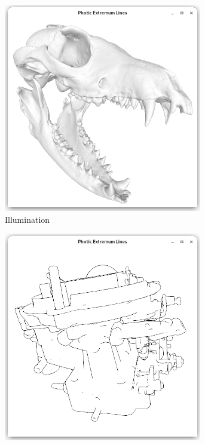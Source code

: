 \documentclass[9pt,fleqn,twoside,twocolumn]{stdglobal}
\begin{document}
\begin{figure}
\begin{subfigure}[t]{0.19\textwidth}
        \includegraphics[width=0.95\textwidth,trim={15px 15 15 50},clip]{images/results/skull.png}
        \caption{Illumination}
      \end{subfigure}%
      \hfill%
      \begin{subfigure}[t]{0.19\textwidth}
        \centering
        \includegraphics[width=0.95\textwidth,trim={15px 15 15 50},clip]{images/results/carburetor-contours.png}

\end{subfigure}
\end{figure}
\end{document}

